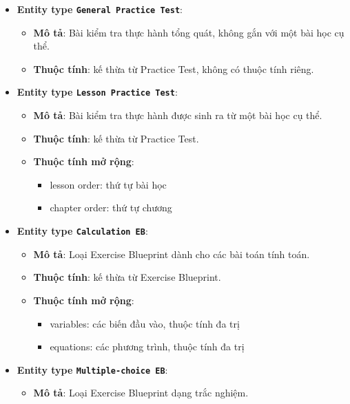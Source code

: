 \begin{itemize}
\item \textbf{Entity type \texttt{General Practice Test}}:
\begin{itemize}
    \item \textbf{Mô tả}: Bài kiểm tra thực hành tổng quát, không gắn với một bài học cụ thể.
    \item \textbf{Thuộc tính}: kế thừa từ Practice Test, không có thuộc tính riêng.
\end{itemize}


\item \textbf{Entity type \texttt{Lesson Practice Test}}:
\begin{itemize}
    \item \textbf{Mô tả}: Bài kiểm tra thực hành được sinh ra từ một bài học cụ thể.
    \item \textbf{Thuộc tính}: kế thừa từ Practice Test.
    \item \textbf{Thuộc tính mở rộng}:
    \begin{itemize}
        \item lesson order: thứ tự bài học
        \item chapter order: thứ tự chương
    \end{itemize}
\end{itemize}


\item \textbf{Entity type \texttt{Calculation EB}}:
\begin{itemize}
    \item \textbf{Mô tả}: Loại Exercise Blueprint dành cho các bài toán tính toán.
    
    \item \textbf{Thuộc tính}: kế thừa từ Exercise Blueprint.
    
    \item \textbf{Thuộc tính mở rộng}:
    \begin{itemize}
        \item variables: các biến đầu vào, thuộc tính đa trị
        \item equations: các phương trình, thuộc tính đa trị
    \end{itemize}
\end{itemize}


\item \textbf{Entity type \texttt{Multiple-choice EB}}:
\begin{itemize}
    \item \textbf{Mô tả}: Loại Exercise Blueprint dạng trắc nghiệm.
    

\end{itemize}
\end{itemize}
